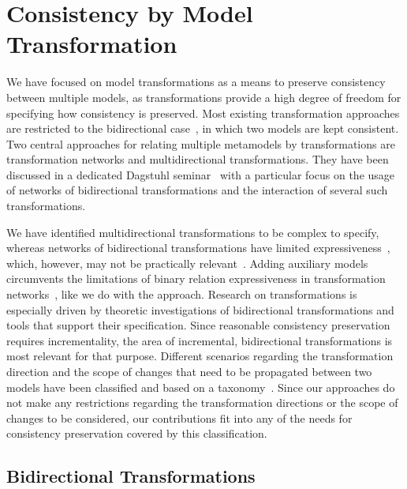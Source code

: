 \section{Consistency by Model Transformation}

We have focused on model transformations as a means to preserve consistency between multiple models, as transformations provide a high degree of freedom for specifying how consistency is preserved.
Most existing transformation approaches are restricted to the bidirectional case~\cite{cleve2019dagstuhl, weidmann2020ApplyingBidirectionalTransformations-WSRE}, in which two models are kept consistent.
Two central approaches for relating multiple metamodels by transformations are transformation networks and multidirectional transformations.
They have been discussed in a dedicated Dagstuhl seminar~\cite{cleve2019dagstuhl} with a particular focus on the usage of networks of bidirectional transformations and the interaction of several such transformations.

We have identified multidirectional transformations to be complex to specify, whereas networks of bidirectional transformations have limited expressiveness~\cite{stevens2020BidirectionalTransformationLarge-SoSym}, which, however, may not be practically relevant~\cite{cleve2019dagstuhl}.
Adding auxiliary models circumvents the limitations of binary relation expressiveness in transformation networks~\cite{stevens2020BidirectionalTransformationLarge-SoSym}, like we do with the \commonalities approach.
Research on transformations is especially driven by theoretic investigations of bidirectional transformations and tools that support their specification.
Since reasonable consistency preservation requires incrementality, the area of incremental, bidirectional transformations is most relevant for that purpose.
Different scenarios regarding the transformation direction and the scope of changes that need to be propagated between two models have been classified and based on a taxonomy~\cite{diskin2016Taxonomy-JSS}.
Since our approaches do not make any restrictions regarding the transformation directions or the scope of changes to be considered, our contributions fit into any of the needs for consistency preservation covered by this classification.


\subsection{Bidirectional Transformations}

